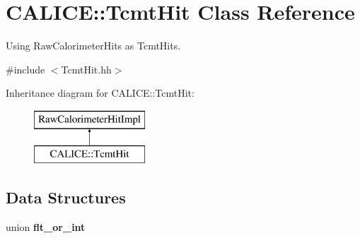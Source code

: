 \section{C\-A\-L\-I\-C\-E\-:\-:Tcmt\-Hit Class Reference}
\label{classCALICE_1_1TcmtHit}


Using Raw\-Calorimeter\-Hits as Tcmt\-Hits.  




{\ttfamily \#include $<$Tcmt\-Hit.\-hh$>$}

Inheritance diagram for C\-A\-L\-I\-C\-E\-:\-:Tcmt\-Hit\-:\begin{figure}[H]
\begin{center}
\leavevmode
\includegraphics[height=2.000000cm]{classCALICE_1_1TcmtHit}
\end{center}
\end{figure}
\subsection*{Data Structures}
\begin{DoxyCompactItemize}
\item 
union {\bf flt\-\_\-or\-\_\-int}
\end{DoxyCompactItemize}

